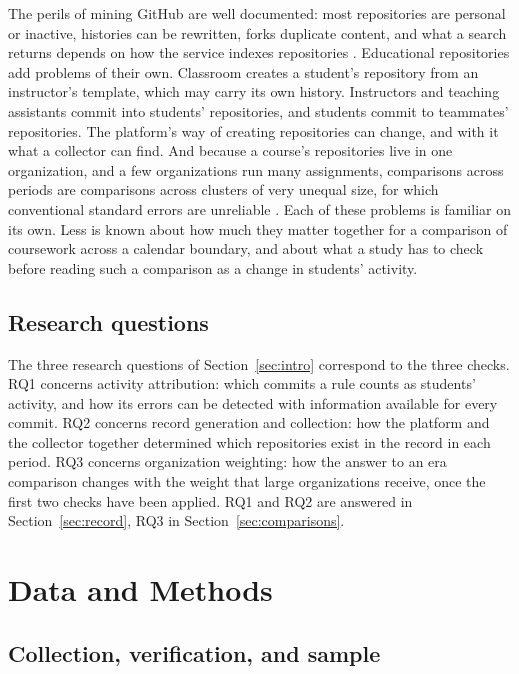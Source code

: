 \documentclass[acmsmall,screen,review,anonymous]{acmart}
\begin{document}
The perils of mining GitHub are well documented: most repositories are personal or inactive, histories can be rewritten, forks duplicate content, and what a search returns depends on how the service indexes repositories \citep{bird2009promises, kalliamvakou2016promises}. Educational repositories add problems of their own. Classroom creates a student's repository from an instructor's template, which may carry its own history. Instructors and teaching assistants commit into students' repositories, and students commit to teammates' repositories. The platform's way of creating repositories can change, and with it what a collector can find. And because a course's repositories live in one organization, and a few organizations run many assignments, comparisons across periods are comparisons across clusters of very unequal size, for which conventional standard errors are unreliable \citep{cameron2008bootstrap, cameron2015practitioner}. Each of these problems is familiar on its own. Less is known about how much they matter together for a comparison of coursework across a calendar boundary, and about what a study has to check before reading such a comparison as a change in students' activity.

\subsection{Research questions}

The three research questions of Section~\ref{sec:intro} correspond to the three checks. RQ1 concerns activity attribution: which commits a rule counts as students' activity, and how its errors can be detected with information available for every commit. RQ2 concerns record generation and collection: how the platform and the collector together determined which repositories exist in the record in each period. RQ3 concerns organization weighting: how the answer to an era comparison changes with the weight that large organizations receive, once the first two checks have been applied. RQ1 and RQ2 are answered in Section~\ref{sec:record}, RQ3 in Section~\ref{sec:comparisons}.

\section{Data and Methods}
\label{sec:methods}

\subsection{Collection, verification, and sample}
\label{sec:data}
\end{document}
